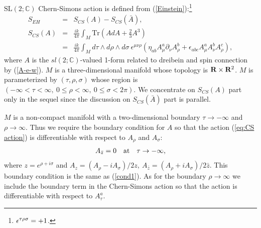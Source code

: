 \documentclass[a4paper,11pt]{article}
\begin{document}
$\textrm{SL}(2;\mathbb{C})$ Chern-Simons action is defined 
from (\ref{Einstein}):\footnote{$\epsilon^{\tau\rho\sigma}={\rm +}1$.}
\begin{eqnarray}
S_{EH}&=&S_{CS}(A) - S_{CS}(\bar{A}), \nonumber \\
S_{CS}(A)&=&\frac{i k}{4 \pi} \int_{M}\textrm{Tr}\left(A dA +
\frac{2}{3} A^{3}\right)\\
&=&\frac{i k}{4 \pi}\int_{M}\!\!\!\! 
d\tau\wedge d\rho\wedge d\sigma~
\epsilon^{\mu\nu\rho}\!\left(\eta_{ab}A_{\mu}^{a}\partial_{\nu}A_{\rho}^{b}
+\epsilon_{abc}A_{\mu}^{a}A_{\nu}^{b}A_{\rho}^{c}\right)\!, 
\label{eq:CS action}
\end{eqnarray} 
where $A$ is the $sl(2;\mathbb{C})$-valued 1-form related to
dreibein and spin connection by (\ref{A-e-w}).
$M$ is a three-dimensional manifold whose topology is ${\bf R} \times
{\bf R}^{2}$. $M$ is parameterized by $(\tau, \rho, \sigma)$ whose region 
is $(-\infty < \tau < \infty,~0 \le \rho < \infty,~0 \le \sigma < 2
\pi)$. We concentrate on $S_{CS}(A)$ part only in the sequel
since the discussion on $S_{CS}(\bar{A})$ part is parallel.

$M$ is a non-compact manifold with a two-dimensional boundary 
$\tau\rightarrow -\infty$ and $\rho\rightarrow\infty$. 
Thus we require the boundary condition for $A$ 
so that the action (\ref{eq:CS action}) is differentiable with respect
to $A_{\rho}$ and $A_{\sigma}$:
\begin{eqnarray}
A_{\bar{z}}=0 \quad {\rm at} \quad \tau \rightarrow -\infty,
\label{eq:boundary condition}
\end{eqnarray}
where $z=e^{\rho +i\sigma}$ and 
$A_{z}=(A_{\rho}-iA_{\sigma})/2z,~
A_{\bar{z}}=(A_{\rho}+iA_{\sigma})/2\bar{z}$.
This boundary condition is the same as (\ref{cond1}).
As for the boundary $\rho\rightarrow\infty$ we include the 
boundary term in the Chern-Simons action so that the action 
is differentiable with respect to $A_{\tau}^{a}$. 
\end{document}
